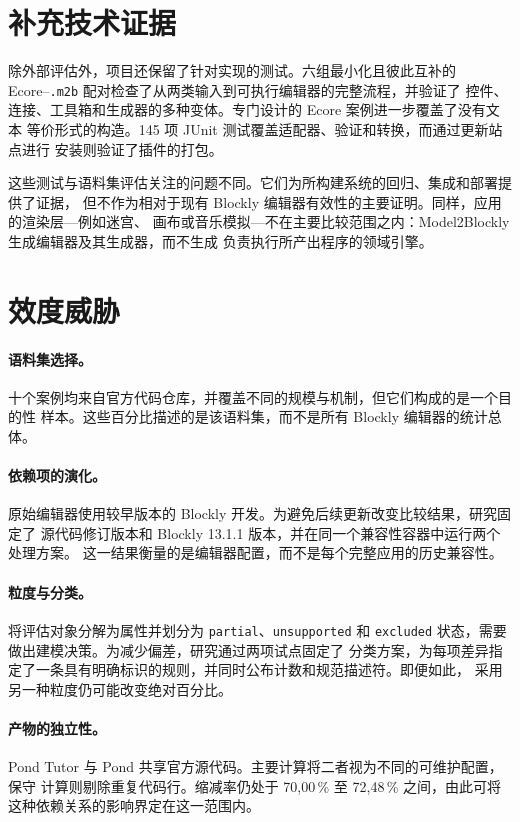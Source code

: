 \section{补充技术证据}
\label{sec:evidencia-complementaria}

除外部评估外，项目还保留了针对实现的测试。六组最小化且彼此互补的
Ecore--\texttt{.m2b} 配对检查了从两类输入到可执行编辑器的完整流程，并验证了
控件、连接、工具箱和生成器的多种变体。专门设计的 Ecore 案例进一步覆盖了没有文本
等价形式的构造。145 项 JUnit 测试覆盖适配器、验证和转换，而通过更新站点进行
安装则验证了插件的打包。

这些测试与语料集评估关注的问题不同。它们为所构建系统的回归、集成和部署提供了证据，
但不作为相对于现有 Blockly 编辑器有效性的主要证明。同样，应用的渲染层---例如迷宫、
画布或音乐模拟---不在主要比较范围之内：Model2Blockly 生成编辑器及其生成器，而不生成
负责执行所产出程序的领域引擎。

\section{效度威胁}
\label{sec:amenazas-validez}

\paragraph{语料集选择。}
十个案例均来自官方代码仓库，并覆盖不同的规模与机制，但它们构成的是一个目的性
样本。这些百分比描述的是该语料集，而不是所有 Blockly 编辑器的统计总体。

\paragraph{依赖项的演化。}
原始编辑器使用较早版本的 Blockly 开发。为避免后续更新改变比较结果，研究固定了
源代码修订版本和 Blockly 13.1.1 版本，并在同一个兼容性容器中运行两个处理方案。
这一结果衡量的是编辑器配置，而不是每个完整应用的历史兼容性。

\paragraph{粒度与分类。}
将评估对象分解为属性并划分为 \texttt{partial}、\texttt{unsupported} 和
\texttt{excluded} 状态，需要做出建模决策。为减少偏差，研究通过两项试点固定了
分类方案，为每项差异指定了一条具有明确标识的规则，并同时公布计数和规范描述符。即便如此，
采用另一种粒度仍可能改变绝对百分比。

\paragraph{产物的独立性。}
Pond Tutor 与 Pond 共享官方源代码。主要计算将二者视为不同的可维护配置，保守
计算则剔除重复代码行。缩减率仍处于 70,00\,\% 至 72,48\,\% 之间，由此可将
这种依赖关系的影响界定在这一范围内。

